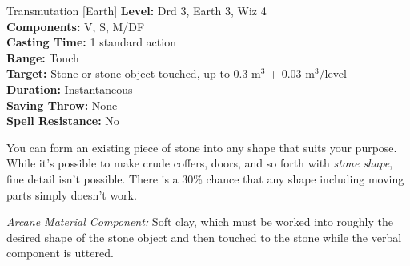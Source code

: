 {Transmutation [Earth]}
{
	\textbf{Level:}
	Drd 3, Earth 3, Wiz 4\\
	\textbf{Components:}
	V, S, M/DF\\
	\textbf{Casting Time:}
	1 standard action\\
	\textbf{Range:}
	Touch\\
	\textbf{Target:}
	Stone or stone object touched, up to 0.3 m$^3$ + 0.03 m$^3$/level\\
	\textbf{Duration:}
	Instantaneous\\
	\textbf{Saving Throw:}
	None\\
	\textbf{Spell Resistance:}
	No\\
}
{
	You can form an existing piece of stone into any shape that suits your purpose. While it's possible to make crude coffers, doors, and so forth with \emph{stone shape}, fine detail isn't possible. There is a 30\% chance that any shape including moving parts simply doesn't work.

	\textit{Arcane Material Component:}
	Soft clay, which must be worked into roughly the desired shape of the stone object and then touched to the stone while the verbal component is uttered.

}
